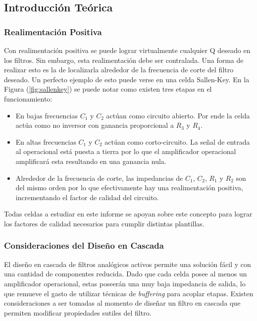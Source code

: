 \subsection{Introducción Teórica}

\subsubsection{Realimentación Positiva}

Con realimentación positiva se puede lograr virtualmente cualquier Q deseado en los filtros. Sin embargo, esta realimentación debe ser contralada. Una forma de realizar esto es la de localizarla alrededor de la frecuencia de corte del filtro deseado. Un perfecto ejemplo de esto puede verse en una celda Sallen-Key. En la Figura (\ref{fig:sallenkey}) se puede notar como existen tres etapas en el funcionamiento:

\begin{itemize}
\item En bajas frecuencias $C_1$ y $C_2$ actúan como circuito abierto. Por ende la celda actúa como no inversor con ganancia proporcional a $R_3$ y $R_4$. 
\item En altas frecuencias $C_1$ y $C_2$ actúan como corto-circuito. La señal de entrada al operacional está puesta a tierra por lo que el amplificador operacional amplificará esta resultando en una ganancia nula. 
\item Alrededor de la frecuencia de corte, las impedancias de $C_1$, $C_2$, $R_1$ y $R_2$ son del mismo orden por lo que efectivamente hay una realimentación positiva, incrementando el factor de calidad del circuito.
\end{itemize}

Todas celdas a estudiar en este informe se apoyan sobre este concepto para lograr los factores de calidad necesarios para cumplir distintas plantillas.

\subsubsection{Consideraciones del Diseño en Cascada}
El diseño en cascada de filtros analógicos activos permite una solución fácil y con una cantidad de componentes reducida. Dado que cada celda posee al menos un amplificador operacional, estas poseerán una muy baja impedancia de salida, lo que remueve el gasto de utilizar técnicas de \textit{buffering} para acoplar etapas. Existen consideraciones a ser tomadas al momento de diseñar un filtro en cascada que permiten modificar propiedades sutiles del filtro. 

